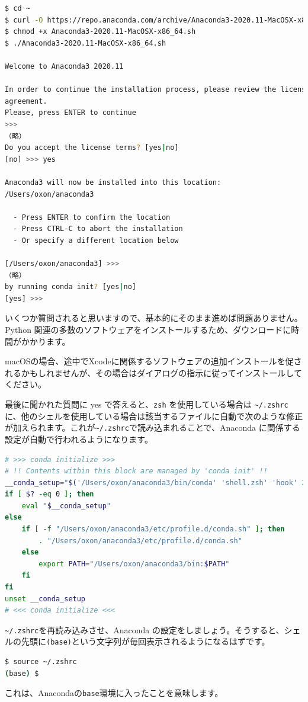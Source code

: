 {\begin{lstlisting}[language=bash]
$ cd ~
$ curl -O https://repo.anaconda.com/archive/Anaconda3-2020.11-MacOSX-x86_64.sh
$ chmod +x Anaconda3-2020.11-MacOSX-x86_64.sh
$ ./Anaconda3-2020.11-MacOSX-x86_64.sh 

Welcome to Anaconda3 2020.11

In order to continue the installation process, please review the license
agreement.
Please, press ENTER to continue
>>> 
（略）
Do you accept the license terms? [yes|no]
[no] >>> yes

Anaconda3 will now be installed into this location:
/Users/oxon/anaconda3

  - Press ENTER to confirm the location
  - Press CTRL-C to abort the installation
  - Or specify a different location below

[/Users/oxon/anaconda3] >>> 
（略）
by running conda init? [yes|no]
[yes] >>> 
\end{lstlisting}
いくつか質問されると思いますので、基本的にそのまま進めば問題ありません。Python 関連の多数のソフトウェアをインストールするため、ダウンロードに時間がかかります。

macOSの場合、途中でXcodeに関係するソフトウェアの追加インストールを促されるかもしれませんが、その場合はダイアログの指示に従ってインストールしてください。

最後に聞かれた質問に yes で答えると、\texttt{zsh} を使用している場合は \texttt{\~{}/.zshrc}に、他のシェルを使用している場合は該当するファイルに自動で次のような修正が加えられます。これが\texttt{\~{}/.zshrc}で読み込まれることで、Anaconda に関係する設定が自動で行われるようになります。

\begin{lstlisting}[language=bash]
# >>> conda initialize >>>
# !! Contents within this block are managed by 'conda init' !!
__conda_setup="$('/Users/oxon/anaconda3/bin/conda' 'shell.zsh' 'hook' 2> /dev/null)"
if [ $? -eq 0 ]; then
    eval "$__conda_setup"
else
    if [ -f "/Users/oxon/anaconda3/etc/profile.d/conda.sh" ]; then
        . "/Users/oxon/anaconda3/etc/profile.d/conda.sh"
    else
        export PATH="/Users/oxon/anaconda3/bin:$PATH"
    fi
fi
unset __conda_setup
# <<< conda initialize <<<
\end{lstlisting}

\texttt{\~{}/.zshrc}を再読み込みさせ、Anaconda の設定をしましょう。そうすると、シェルの先頭に\texttt{(base)}という文字列が毎回表示されるようになるはずです。
\begin{lstlisting}[language=bash]
$ source ~/.zshrc
(base) $  
\end{lstlisting}
これは、Anacondaの\texttt{base}環境に入ったことを意味します。

}
